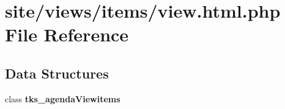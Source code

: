 \section{site/views/items/view.html.\+php File Reference}
\label{site_2views_2items_2view_8html_8php}
\subsection*{Data Structures}
\begin{DoxyCompactItemize}
\item 
class \textbf{ tks\+\_\+agenda\+Viewitems}
\end{DoxyCompactItemize}
